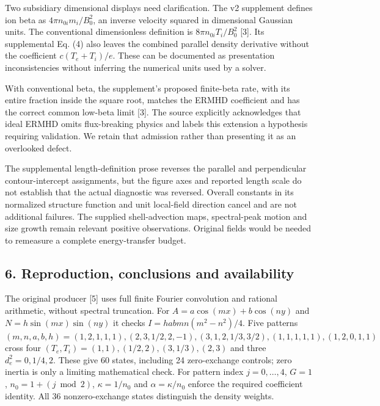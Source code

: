 Two subsidiary dimensional displays need clarification. The v2
supplement defines ion beta as \(4\pi n_{0i}m_i/B_0^2\), an inverse
velocity squared in dimensional Gaussian units. The conventional
dimensionless definition is \(8\pi n_{0i}T_i/B_0^2\) {[}3{]}. Its
supplemental Eq. (4) also leaves the combined parallel density
derivative without the coefficient \(c(T_e+T_i)/e\). These can be
documented as presentation inconsistencies without inferring the
numerical units used by a solver.

With conventional beta, the supplement's proposed finite-beta rate, with
its entire fraction inside the square root, matches the ERMHD
coefficient and has the correct common low-beta limit {[}3{]}. The
source explicitly acknowledges that ideal ERMHD omits flux-breaking
physics and labels this extension a hypothesis requiring validation. We
retain that admission rather than presenting it as an overlooked defect.

The supplemental length-definition prose reverses the parallel and
perpendicular contour-intercept assignments, but the figure axes and
reported length scale do not establish that the actual diagnostic was
reversed. Overall constants in its normalized structure function and
unit local-field direction cancel and are not additional failures. The
supplied shell-advection maps, spectral-peak motion and size growth
remain relevant positive observations. Original fields would be needed
to remeasure a complete energy-transfer budget.

\subsection{6. Reproduction, conclusions and
availability}\label{reproduction-conclusions-and-availability}

The original producer {[}5{]} uses full finite Fourier convolution and
rational arithmetic, without spectral truncation. For
\(A=a\cos(mx)+b\cos(ny)\) and \(N=h\sin(mx)\sin(ny)\) it checks
\(I=habmn(m^2-n^2)/4\). Five patterns
\((m,n,a,b,h)=(1,2,1,1,1),(2,3,1/2,2,-1),(3,1,2,1/3,3/2),(1,1,1,1,1),(1,2,0,1,1)\)
cross four \((T_e,T_i)=(1,1),(1/2,2),(3,1/3),(2,3)\) and three
\(d_e^2=0,1/4,2\). These give 60 states, including 24 zero-exchange
controls; zero inertia is only a limiting mathematical check. For
pattern index \(j=0,\ldots,4\), \(G=1\), \(n_0=1+(j\bmod2)\),
\(\kappa=1/n_0\) and \(\alpha=\kappa/n_0\) enforce the required
coefficient identity. All 36 nonzero-exchange states distinguish the
density weights.

